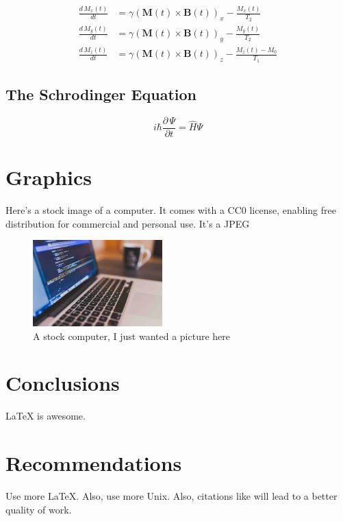 \documentclass{workreport}
\begin{document}
\begin{body}
	\begin{align}
		\frac{d\, M_x(t)}{dt} &= \gamma(\mathbf{M}(t) \times \mathbf{B}(t))_x - \frac{M_x(t)}{T_2} \\
		\frac{d\, M_y(t)}{dt} &= \gamma(\mathbf{M}(t) \times \mathbf{B}(t))_y - \frac{M_y(t)}{T_2} \\
		\frac{d\, M_z(t)}{dt} &= \gamma(\mathbf{M}(t) \times \mathbf{B}(t))_z - \frac{M_z(t) - M_0}{T_1}
	\end{align}

\subsection{The Schrodinger Equation}

	\begin{equation}
		i\hbar \frac{\partial \, \Psi}{\partial t} = \hat{H}\Psi
	\end{equation}

\section{Graphics}
    Here's a stock image of a computer. It comes with a CC0 license, enabling
    free distribution for commercial and personal use. It's a JPEG

    \begin{figure}[!ht]
    	\centering
        \label{fig:stock_computer}
        \includegraphics[width=5cm]{./stock-image.jpg}
        \caption{A stock computer, I just wanted a picture here}
    \end{figure}

\section{Conclusions}
	\gls{LaTeX} is awesome.

\section{Recommendations}

	Use more \LaTeX. Also, use more \gls{Unix}. Also, citations like
    \cite{schweiger_principles_2001} will lead to a better quality of work.

\end{body}

\begin{backmatter}

		\lipsum[1-2]

		\lipsum[1-2]

\end{backmatter}
\end{document}
